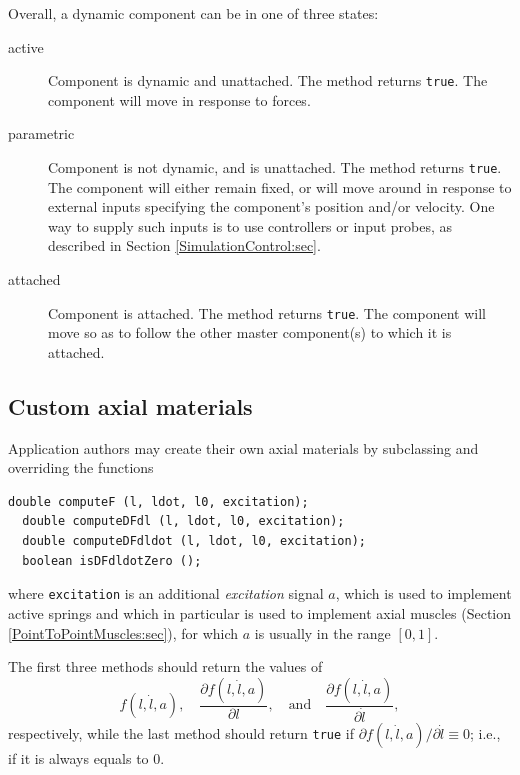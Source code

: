 Overall, a dynamic component can be in one of three states:

\begin{description}

\item[active]\mbox{}

Component is dynamic and unattached. The method
returns {\tt true}. The component will move in response to forces.

\item[parametric]\mbox{}

Component is not dynamic, and is unattached. 
The method
returns {\tt true}.
The component will either remain
fixed, or will move around in response to external inputs specifying
the component's position and/or velocity. One way to supply such
inputs is to use controllers or input probes, as described in
Section \ref{SimulationControl:sec}.

\item[attached]\mbox{}

Component is attached. The method
returns {\tt true}. The component will move so as to follow the other
master component(s) to which it is attached.

\end{description}

\subsection{Custom axial materials}

Application authors may create their
own axial materials by subclassing 
and overriding the functions
%
\begin{lstlisting}[]
  double computeF (l, ldot, l0, excitation);
  double computeDFdl (l, ldot, l0, excitation);
  double computeDFdldot (l, ldot, l0, excitation);
  boolean isDFdldotZero ();
\end{lstlisting}
%
where {\tt excitation} is an additional {\it excitation} signal $a$, which
is used to implement active springs and which in particular is used to
implement axial muscles (Section \ref{PointToPointMuscles:sec}), for
which $a$ is usually in the range $[0, 1]$.

The first three methods should return the values of 
%
\begin{equation}
f (l, \dot l, a), \quad
\frac{\partial f(l, \dot l, a)}{\partial l}, \quad \text{and} \quad
\frac{\partial f(l, \dot l, a)}{\partial \dot l},
\end{equation}
%
respectively, while the last method should return {\tt true} if
$\partial f(l, \dot l, a) / \partial \dot l \equiv 0$; i.e., if it is
always equals to 0.

